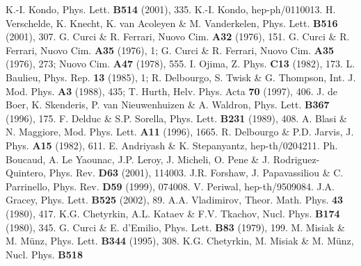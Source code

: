 \documentclass[a4paper,11pt]{article}
\begin{document}
\begin{thebibliography}{99} 
 K.-I. Kondo, Phys. Lett. {\bf B514} (2001), 335.  
 K.-I. Kondo, hep-ph/0110013. 
 H. Verschelde, K. Knecht, K. van Acoleyen \& M. Vanderkelen, 
Phys. Lett. {\bf B516} (2001), 307. 
 G. Curci \& R. Ferrari, Nuovo Cim. {\bf A32} (1976), 151. 
 G. Curci \& R. Ferrari, Nuovo Cim. {\bf A35} (1976), 1; 
G. Curci \& R. Ferrari, Nuovo Cim. {\bf A35} (1976), 273; 
Nuovo Cim. {\bf A47} (1978), 555. 
 I. Ojima, Z. Phys. {\bf C13} (1982), 173.  
 L. Baulieu, Phys. Rep. {\bf 13} (1985), 1; 
R. Delbourgo, S. Twisk \& G. Thompson, Int. J. Mod. Phys. {\bf A3} (1988), 435;
T. Hurth, Helv. Phys. Acta {\bf 70} (1997), 406. 
 J. de Boer, K. Skenderis, P. van Nieuwenhuizen \& A. Waldron, Phys.
Lett. {\bf B367} (1996), 175. 
 F. Delduc \& S.P. Sorella, Phys. Lett. {\bf B231} (1989), 408. 
 A. Blasi \& N. Maggiore, Mod. Phys. Lett. {\bf A11} (1996), 1665. 
 R. Delbourgo \& P.D. Jarvis, J. Phys. {\bf A15} (1982), 611.
 E. Andriyash \& K. Stepanyantz, hep-th/0204211. 
 Ph. Boucaud, A. Le Yaounac, J.P. Leroy, J. Micheli, O. Pene \&
J. Rodriguez-Quintero, Phys. Rev. {\bf D63} (2001), 114003. 
 J.R. Forshaw, J. Papavassiliou \& C. Parrinello, Phys. Rev. {\bf
D59} (1999), 074008. 
 V. Periwal, hep-th/9509084. 
 J.A. Gracey, Phys. Lett. {\bf B525} (2002), 89. 
 A.A. Vladimirov, Theor. Math. Phys. {\bf 43} (1980), 417.
 K.G. Chetyrkin, A.L. Kataev \& F.V. Tkachov, Nucl. Phys. {\bf 
B174} (1980), 345.
 G. Curci \& E. d'Emilio, Phys. Lett. {\bf B83} (1979), 199. 
 M. Misiak \& M. M\"{u}nz, Phys. Lett. {\bf B344} (1995), 308.
 K.G. Chetyrkin, M. Misiak \& M. M\"{u}nz, Nucl. Phys. {\bf B518} 

\end{thebibliography}
\end{document}
